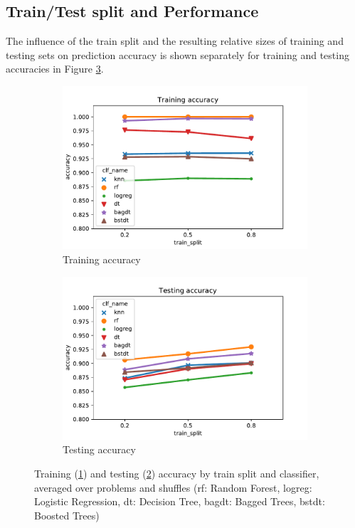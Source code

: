 \documentclass[twoside,11pt]{article}
\begin{document}
		\subsection{Train/Test split and Performance}
			The influence of the train split and the resulting relative sizes of training and testing sets on prediction accuracy is shown separately for training and testing accuracies in Figure \ref{fig:perf_by_trainsplit}.
			
			\begin{figure}[h]
				\begin{subfigure}{.5\textwidth}
					\includegraphics[width=\textwidth]{tr_acc_by_clf_trainsplit}
					\caption{Training accuracy}
					\label{fig:perf_by_trainsplit_tr}
				\end{subfigure}
				\begin{subfigure}{.5\textwidth}
					\includegraphics[width=\textwidth]{te_acc_by_clf_trainsplit}
					\caption{Testing accuracy}
					\label{fig:perf_by_trainsplit_te}
				\end{subfigure}
				\caption{Training (\ref{fig:perf_by_trainsplit_tr}) and testing (\ref{fig:perf_by_trainsplit_te}) accuracy by train split and classifier, averaged over problems and shuffles (rf: Random Forest, logreg: Logistic Regression, dt: Decision Tree, bagdt: Bagged Trees, bstdt: Boosted Trees)}
				\label{fig:perf_by_trainsplit}
			\end{figure}
		
\end{document}
